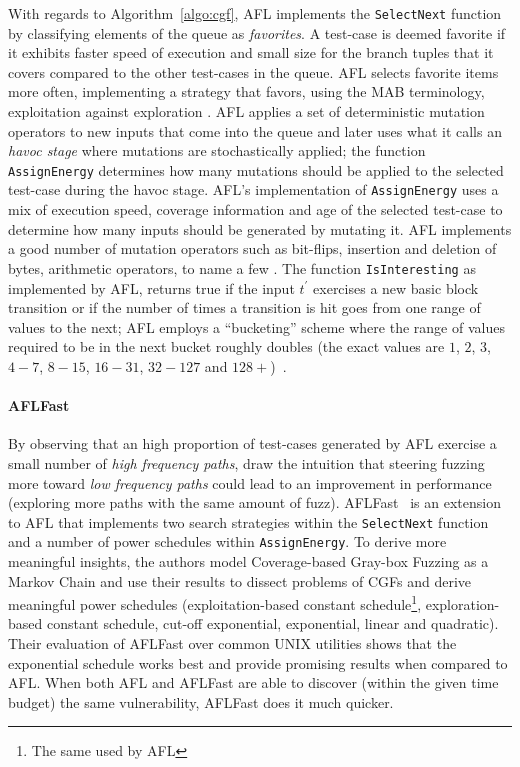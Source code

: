 With regards to Algorithm~\ref{algo:cgf}, AFL implements the \texttt{SelectNext}
function by classifying elements of the queue as \emph{favorites}. A test-case
is deemed favorite if it exhibits faster speed of execution and small size for
the branch tuples that it covers compared to the other test-cases in the queue.
AFL selects favorite items more often, implementing a strategy that favors,
using the \ac{MAB} terminology, exploitation against exploration
\cite{bohme2017coverage}. AFL applies a set of deterministic mutation operators
to new inputs that come into the queue and later uses what it calls an
\emph{havoc stage} where mutations are stochastically applied; the function
\texttt{AssignEnergy} determines how many mutations should be applied to the
selected test-case during the havoc stage. AFL's implementation of
\texttt{AssignEnergy} uses a mix of execution speed, coverage information and
age of the selected test-case to determine how many inputs should be generated
by mutating it. AFL implements a good number of mutation operators such as
bit-flips, insertion and deletion of bytes, arithmetic operators, to name a few
\cite{aflmut}. The function \texttt{IsInteresting} as implemented by AFL,
returns true if the input $t^\prime$ exercises a new basic block transition or
if the number of times a transition is hit goes from one range of values to the
next; AFL employs a ``bucketing'' scheme where the range of values required to
be in the next bucket roughly doubles (the exact values are $1$, $2$, $3$,
$4-7$, $8-15$, $16-31$, $32-127$ and $128+$)~\cite{afltech}.

\paragraph{AFLFast}
By observing that an high proportion of test-cases generated by AFL exercise a
small number of \emph{high frequency paths}, \citeauthor{bohme2017coverage} draw
the intuition that steering fuzzing more toward \emph{low frequency paths} could
lead to an improvement in performance (exploring more paths with the same amount
of fuzz). AFLFast~\cite{bohme2017coverage} is an extension to AFL that
implements two search strategies within the \texttt{SelectNext} function and a
number of power schedules within \texttt{AssignEnergy}. To derive more
meaningful insights, the authors model Coverage-based Gray-box Fuzzing as a
Markov Chain and use their results to dissect problems of \acp{CGF} and derive
meaningful power schedules (exploitation-based constant schedule\footnote{The
same used by AFL}, exploration-based constant schedule, cut-off exponential,
exponential, linear and quadratic). Their evaluation of AFLFast over common UNIX
utilities shows that the exponential schedule works best and provide promising
results when compared to AFL\@. When both AFL and AFLFast are able to discover
(within the given time budget) the same vulnerability, AFLFast does it much
quicker.

